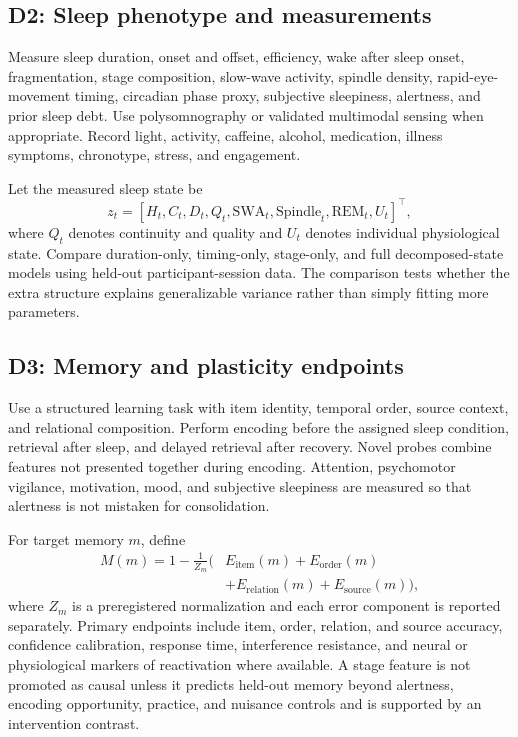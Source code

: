 \documentclass[conference]{IEEEtran}
\begin{document}
\subsection{D2: Sleep phenotype and measurements}
Measure sleep duration, onset and offset, efficiency, wake after sleep onset, fragmentation, stage composition, slow-wave activity, spindle density, rapid-eye-movement timing, circadian phase proxy, subjective sleepiness, alertness, and prior sleep debt. Use polysomnography or validated multimodal sensing when appropriate. Record light, activity, caffeine, alcohol, medication, illness symptoms, chronotype, stress, and engagement.

Let the measured sleep state be
\begin{equation}
z_t=[H_t,C_t,D_t,Q_t,\mathrm{SWA}_t,\mathrm{Spindle}_t,\mathrm{REM}_t,U_t]^\top,
\label{eq:sleepstate}
\end{equation}
where $Q_t$ denotes continuity and quality and $U_t$ denotes individual physiological state. Compare duration-only, timing-only, stage-only, and full decomposed-state models using held-out participant-session data. The comparison tests whether the extra structure explains generalizable variance rather than simply fitting more parameters.

\subsection{D3: Memory and plasticity endpoints}
Use a structured learning task with item identity, temporal order, source context, and relational composition. Perform encoding before the assigned sleep condition, retrieval after sleep, and delayed retrieval after recovery. Novel probes combine features not presented together during encoding. Attention, psychomotor vigilance, motivation, mood, and subjective sleepiness are measured so that alertness is not mistaken for consolidation.

For target memory $m$, define
\begin{equation}
\begin{aligned}
M(m)=1-\frac{1}{Z_m}\big(&E_{\mathrm{item}}(m)+E_{\mathrm{order}}(m)\\
&+E_{\mathrm{relation}}(m)+E_{\mathrm{source}}(m)\big),
\end{aligned}
\label{eq:memory}
\end{equation}
where $Z_m$ is a preregistered normalization and each error component is reported separately. Primary endpoints include item, order, relation, and source accuracy, confidence calibration, response time, interference resistance, and neural or physiological markers of reactivation where available. A stage feature is not promoted as causal unless it predicts held-out memory beyond alertness, encoding opportunity, practice, and nuisance controls and is supported by an intervention contrast.
\end{document}
